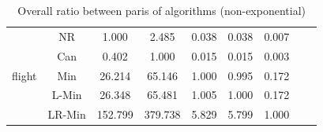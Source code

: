 \documentclass[11pt]{book}
\begin{document}
\begin{table}
\begin{tabular}{|c|c|c|c|c|c|c|c|c|}
    \hline
    \multirow{5}{*}{flight}
         & NR & 1.000 & 2.485 & 0.038 & 0.038 & 0.007 \\                                                                                                                                                             
         & Can & 0.402 & 1.000 & 0.015 & 0.015 & 0.003 \\                                                                                                                                                            
         & Min & 26.214 & 65.146 & 1.000 & 0.995 & 0.172 \\                                                                                                                                                          
         & L-Min & 26.348 & 65.481 & 1.005 & 1.000 & 0.172 \\                                                                                                                                                        
         & LR-Min & 152.799 & 379.738 & 5.829 & 5.799 & 1.000 \\          
              	
    \hline
        
\end{tabular}

	\caption{Overall ratio between paris of algorithms (non-exponential)}

\end{table}
\end{document}
